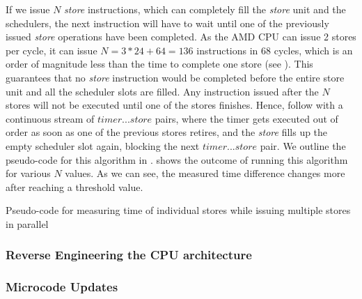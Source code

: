 If we issue $N$ \textit{store} instructions, which can completely fill the \textit{store} unit and the schedulers, the next instruction will have to wait until one of the previously issued \textit{store} operations have been completed.
As the AMD CPU can issue 2 stores per cycle, it can issue $N = 3 * 24 + 64 = 136$ instructions in 68 cycles, which is an order of magnitude less than the time to complete one store (see ).
This guarantees that no \textit{store} instruction would be completed before the entire store unit and all the scheduler slots are filled.
Any instruction issued after the $N$ stores will not be executed until one of the stores finishes.
Hence, follow with a continuous stream of $timer...store$ pairs, where the timer gets executed out of order as soon as one of the previous stores retires, and the \textit{store} fills up the empty scheduler slot again, blocking the next $timer...store$ pair.
We outline the pseudo-code for this algorithm in .
 shows the outcome of running this algorithm for various $N$ values. 
As we can see, the measured time difference changes more after reaching a threshold value.

\begin{minipage}{\textwidth}

\captionsetup{type=lstlisting}
\caption{Pseudo-code for measuring time of individual stores while issuing multiple stores in parallel}
\label{lst:measuring-time}
\end{minipage}

\subsubsection{Reverse Engineering the CPU architecture}
\label{subsubsec:interconnect-sc-store-ops-challenges-reverse-engineering}


\subsubsection{Microcode Updates}
\label{subsubsec:interconnect-sc-store-ops-challenges-microcode-updates}